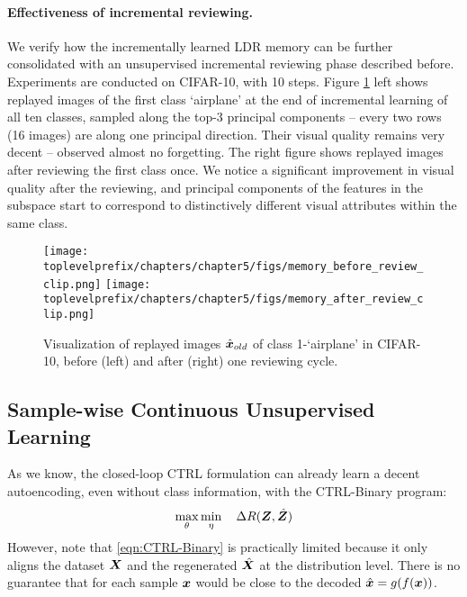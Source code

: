 \documentclass[../../book-main.tex]{subfiles}
\begin{document}
\paragraph{Effectiveness of incremental reviewing.}
We verify how the incrementally learned LDR memory can be further consolidated with an unsupervised incremental reviewing phase described before. Experiments are conducted on CIFAR-10, with 10 steps. Figure \ref{fig:memory_review} left shows replayed images of the first class `airplane' at the end of incremental learning of all ten classes, sampled along the top-3 principal components -- every two rows (16 images) are along one principal direction. Their  visual quality remains very decent -- observed almost no forgetting. The right figure shows replayed images after reviewing the first class once. We notice a significant improvement in visual quality after the reviewing, and principal components of the features in the subspace start to correspond to distinctively different visual attributes within the same class.

\begin{figure}
\centering
\texttt{[image: \\toplevelprefix/chapters/chapter5/figs/memory\_before\_review\_clip.png]}
\texttt{[image: \\toplevelprefix/chapters/chapter5/figs/memory\_after\_review\_clip.png]}
 \caption{\small Visualization of replayed images $\hat{\bm{x}}_{old}$ of class 1-`airplane' in CIFAR-10, before (left) and after (right) one reviewing cycle.} 
\label{fig:memory_review}
\end{figure}


\subsection{Sample-wise Continuous Unsupervised Learning}
\label{sec:sample-wise-incremental}

As we know, the closed-loop CTRL formulation can already learn a decent autoencoding, even without class information, with the  CTRL-Binary program:
\begin{align}
      \max_\theta \min_\eta \quad \Delta R(\bm{Z}, \hat{\bm{Z}}) 
 \label{eqn:CTRL-Binary}
\end{align}
However, note that \eqref{eqn:CTRL-Binary} is practically limited because it only aligns the dataset $\bm{X}$ and the regenerated $\hat {\bm{X}}$ at the distribution level. 
There is no guarantee that for each sample $\bm{x}$ would be close to the decoded $\hat {\bm{x}} = g(f(\bm{x}))$. 
\end{document}
